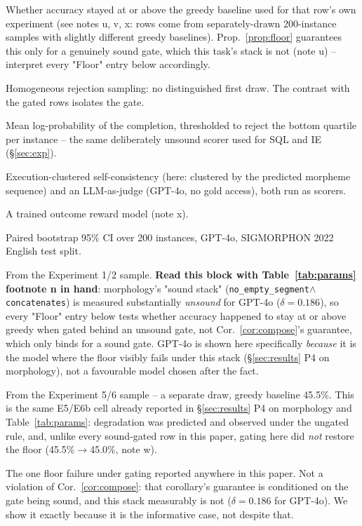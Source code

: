 \documentclass[11pt]{article}
\begin{document}
\begin{table}[t]
\begin{threeparttable}
\begin{tablenotes}[flushleft]
\item[c] Whether accuracy stayed at or above the greedy baseline used for that row's own experiment (see notes u, v, x: rows come from separately-drawn 200-instance samples with slightly different greedy baselines). Prop.~\ref{prop:floor} guarantees this only for a genuinely sound gate, which this task's stack is not (note u) -- interpret every "Floor" entry below accordingly.
\item[e] Homogeneous rejection sampling: no distinguished first draw. The contrast with the gated rows isolates the gate.
\item[f] Mean log-probability of the completion, thresholded to reject the bottom quartile per instance -- the same deliberately unsound scorer used for SQL and IE (\S\ref{sec:exp}).
\item[j] Execution-clustered self-consistency (here: clustered by the predicted morpheme sequence) and an LLM-as-judge (GPT-4o, no gold access), both run as scorers.
\item[l] A trained outcome reward model (note x).
\item[t] Paired bootstrap 95\% CI over 200 instances, GPT-4o, SIGMORPHON 2022 English test split.
\item[u] From the Experiment 1/2 sample. \textbf{Read this block with Table~\ref{tab:params} footnote n in hand}: morphology's "sound stack" (\texttt{no\_empty\_segment}$\wedge$\texttt{concatenates}) is measured substantially \emph{unsound} for GPT-4o ($\delta=0.186$), so every "Floor" entry below tests whether accuracy happened to stay at or above greedy when gated behind an unsound gate, not Cor.~\ref{cor:compose}'s guarantee, which only binds for a sound gate. GPT-4o is shown here specifically \emph{because} it is the model where the floor visibly fails under this stack (\S\ref{sec:results} P4 on morphology), not a favourable model chosen after the fact.
\item[v] From the Experiment 5/6 sample -- a separate draw, greedy baseline 45.5\%. This is the same E5/E6b cell already reported in \S\ref{sec:results} P4 on morphology and Table~\ref{tab:params}: degradation was predicted and observed under the ungated rule, and, unlike every sound-gated row in this paper, gating here did \emph{not} restore the floor (45.5\%$\to$45.0\%, note w).
\item[w] The one floor failure under gating reported anywhere in this paper. Not a violation of Cor.~\ref{cor:compose}: that corollary's guarantee is conditioned on the gate being sound, and this stack measurably is not ($\delta=0.186$ for GPT-4o). We show it exactly because it is the informative case, not despite that.

\end{tablenotes}
\end{threeparttable}
\end{table}
\end{document}
